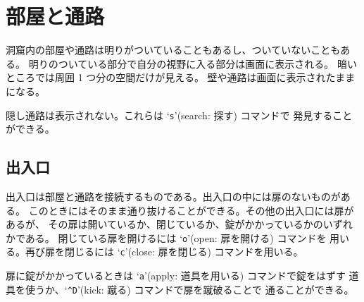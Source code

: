 \section{部屋と通路}

洞窟内の部屋や通路は明りがついていることもあるし、ついていないこともある。
明りのついている部分で自分の視野に入る部分は画面に表示される。
暗いところでは周囲 1 つ分の空間だけが見える。
壁や通路は画面に表示されたままになる。

隠し通路は表示されない。これらは `{\tt s}'(search: 探す) コマンドで
発見することができる。

\subsection*{出入口}

出入口は部屋と通路を接続するものである。出入口の中には扉のないものがある。
このときにはそのまま通り抜けることができる。その他の出入口には扉があるが、
その扉は開いているか、閉じているか、錠がかかっているかのいずれかである。
閉じている扉を開けるには `{\tt o}'(open: 扉を開ける) コマンドを
用いる。再び扉を閉じるには `{\tt c}'(close: 扉を閉じる) コマンドを用いる。

扉に錠がかかっているときは `{\tt a}'(apply: 道具を用いる) コマンドで錠をはずす
道具を使うか、`{\tt \^{}D}'(kick: 蹴る) コマンドで扉を蹴破ることで
通ることができる。

